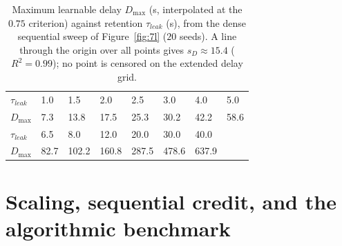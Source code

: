\begin{table}[H]
    \caption[Source data: retention--delay scaling law (Fig.~\ref{fig:7l}).]{Maximum
    learnable delay $D_{\max}$ (s, interpolated at the $0.75$ criterion) against
    retention $\tau_{leak}$ (s), from the dense sequential sweep of Figure~\ref{fig:7l}
    ($20$ seeds). A line through the origin over all points gives $s_D\approx15.4$
    ($R^2=0.99$); no point is censored on the extended delay grid.}
    \begin{center}
    \footnotesize
    \begin{tabularx}{\textwidth}{@{}l *{7}{Y}@{}}
    \toprule
    $\tau_{leak}$ & 1.0 & 1.5 & 2.0 & 2.5 & 3.0 & 4.0 & 5.0 \\
    $D_{\max}$    & 7.3 & 13.8 & 17.5 & 25.3 & 30.2 & 42.2 & 58.6 \\
    \midrule
    $\tau_{leak}$ & 6.5 & 8.0 & 12.0 & 20.0 & 30.0 & 40.0 & \\
    $D_{\max}$    & 82.7 & 102.2 & 160.8 & 287.5 & 478.6 & 637.9 & \\
    \bottomrule
    \end{tabularx}
    \label{table:E4}
    \end{center}
    \vspace*{-\baselineskip}
\end{table}

\section{Scaling, sequential credit, and the algorithmic benchmark}

